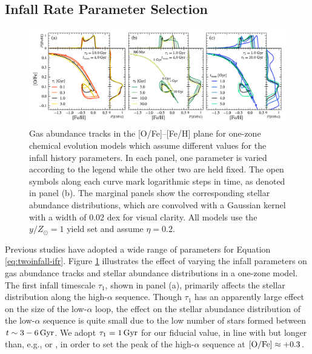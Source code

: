 \documentclass[twocolumn,twocolappendix,linenumbers]{aastex631}
\newcommand{\mathOFe}{{\rm [O/Fe]}}
\newcommand{\yZ}[1]{$y/Z_\odot=#1$}
\begin{document}
\subsection{Infall Rate Parameter Selection}
\label{sec:parameter-selection}

\begin{figure}
    \centering
    \includegraphics{figures/onezone_params.pdf}
    \caption{Gas abundance tracks in the [O/Fe]--[Fe/H] plane for one-zone chemical evolution models which assume different values for the infall history parameters. In each panel, one parameter is varied according to the legend while the other two are held fixed. The open symbols along each curve mark logarithmic steps in time, as denoted in panel (b). The marginal panels show the corresponding stellar abundance distributions, which are convolved with a Gaussian kernel with a width of 0.02 dex for visual clarity. All models use the \yZ{1} yield set and assume $\eta=0.2$.}
    \label{fig:twoinfall-parameters}
\end{figure}

Previous studies have adopted a wide range of parameters for Equation \ref{eq:twoinfall-ifr}. Figure \ref{fig:twoinfall-parameters} illustrates the effect of varying the infall parameters on gas abundance tracks and stellar abundance distributions in a one-zone model. The first infall timescale $\tau_1$, shown in panel (a), primarily affects the stellar distribution along the high-$\alpha$ sequence. Though $\tau_1$ has an apparently large effect on the size of the low-$\alpha$ loop, the effect on the stellar abundance distribution of the low-$\alpha$ sequence is quite small due to the low number of stars formed between $t\sim3-6\,{\rm Gyr}$. We adopt $\tau_1=1\,{\rm Gyr}$ for our fiducial value, in line with \citet{spitoni_galactic_2020} but longer than, e.g., \citet{nissen_high-precision_2020} or \citet{spitoni_apogee_2021}, in order to set the peak of the high-$\alpha$ sequence at $\mathOFe\approx+0.3$. 
\end{document}
